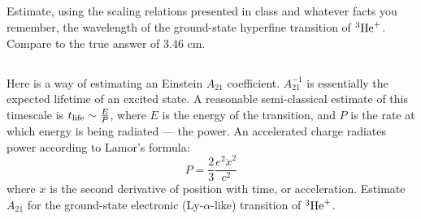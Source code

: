 \documentclass[11pt]{article}
\begin{document}
\subsection{}
Estimate, using the scaling relations presented in class and whatever facts you
remember, the wavelength of the ground-state hyperfine transition of ${^3{\rm He}^+}$.  Compare
to the true answer of 3.46 cm.

\subsection{}
Here is a way of estimating an Einstein $A_{21}$ coefficient.  $A_{21}^{-1}$ is 
essentially the expected lifetime of an excited state.  A reasonable semi-classical estimate
of this timescale is $t_{\rm life}\sim\frac{E}{P}$, where
$E$ is the energy of the transition, and $P$ is the rate at which
energy is being radiated --- the power.
An accelerated charge radiates power according to Lamor's formula:
\begin{equation}
P=\frac23\frac{e^2\ddot x^2}{c^2}
\end{equation}
where $\ddot x$ is the second derivative of position with time, or acceleration.  Estimate
$A_{21}$ for the ground-state electronic (Ly-$\alpha$-like) transition of ${^3{\rm He}^+}$.
\end{document}
